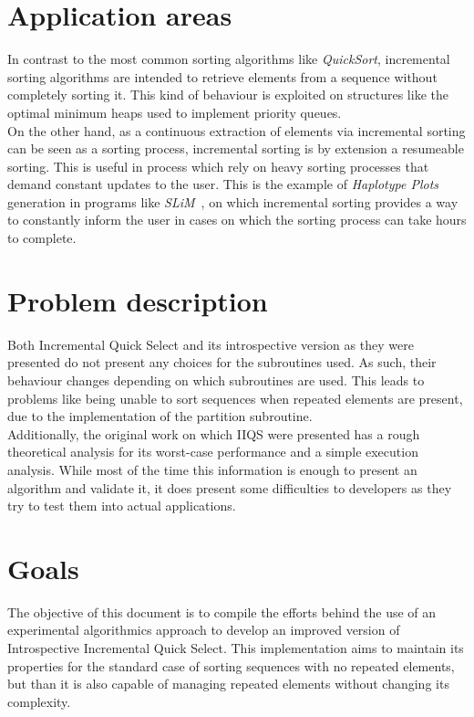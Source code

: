 \section{Application areas}

In contrast to the most common sorting algorithms like \emph{QuickSort}, incremental sorting algorithms are intended to retrieve elements from a sequence without completely sorting it. This kind of behaviour is exploited on structures like the optimal minimum heaps used to implement priority queues. \\

On the other hand, as a continuous extraction of elements via incremental sorting can be seen as a sorting process, incremental sorting is by extension a resumeable sorting. This is useful in process which rely on heavy sorting processes that demand constant updates to the user. This is the example of \emph{Haplotype Plots} generation in programs like \emph{SLiM}~\cite{10.1093/molbev/msw211}, on which incremental sorting provides a way to constantly inform the user in cases on which the sorting process can take hours to complete.\\

\section{Problem description}
Both Incremental Quick Select and its introspective version as they were presented do not present any choices for the subroutines used. As such, their behaviour changes depending on which subroutines are used. This leads to problems like being unable to sort sequences when repeated elements are present, due to the implementation of the partition subroutine.\\

Additionally, the original work on which IIQS were presented has a rough theoretical analysis for its worst-case performance and a simple execution analysis. While most of the time this information is enough to present an algorithm and validate it, it does present some difficulties to developers as they try to test them into actual applications.\\

\section{Goals}
The objective of this document is to compile the efforts behind the use of an experimental algorithmics approach to develop an improved version of Introspective Incremental Quick Select. This implementation aims to maintain its properties for the standard case of sorting sequences with no repeated elements, but than it is also capable of managing repeated elements without changing its complexity.\\

